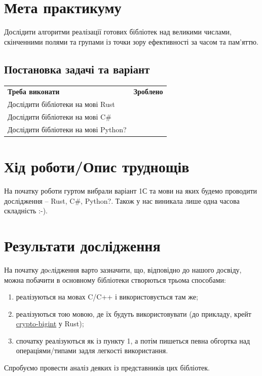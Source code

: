 \section{Мета практикуму}

Дослідити алгоритми реалізації готових бібліотек над великими числами, скінченними полями та групами із точки зору ефективності за часом та пам'яттю.

\subsection{Постановка задачі та варіант}
\begin{tabularx}{\textwidth}{X|X}
	\textbf{Треба виконати} & \textbf{Зроблено} \\
	Дослідити бібліотеки на мові Rust & \checkmark \\
	Дослідити бібліотеки на мові C# & \checkmark \\
	Дослідити бібліотеки на мові Python? & \checkmark \\
\end{tabularx}

\section{Хід роботи/Опис труднощів}
	На початку роботи гуртом вибрали варіант 1С та мови на яких будемо проводити дослідження -- Rust, C#, Python?. Також у нас виникала лише одна часова складність :-).

\section{Результати дослідження}
На початку доcлідження варто зазначити, що, відповідно до нашого досвіду, можна побачити в основному бібліотеки створються трьома способами:
\begin{enumerate}
	\item реалізуються на мовах C/C++ і використовується там же;
	\item реалізуються тою мовою, де їх будуть використовувати (до прикладу, крейт \href{https://docs.rs/crypto-bigint/latest/crypto_bigint/}{crypto-bigint} у Rust);
	\item спочатку реалізуються як із пункту 1, а потім пишеться певна обгортка над операціями/типами задля легкості використання.
\end{enumerate}

Спробуємо провести аналіз деяких із представників цих бібліотек.

